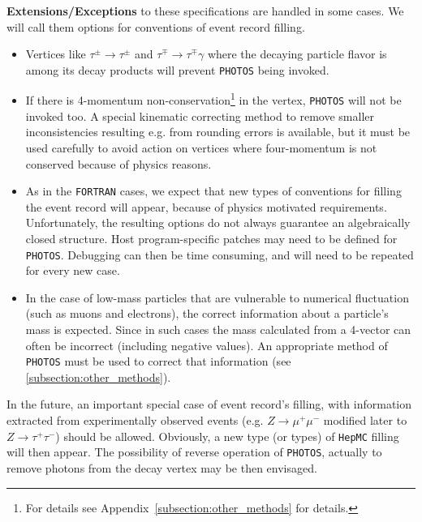 \documentclass[]{Photos_interface_design}
\begin{document}
\noindent
\textbf{ Extensions/Exceptions} to these specifications are handled in some cases. We will call them
options for conventions of event record filling.
  \begin{itemize} 
    \item  Vertices like $\tau^\pm \rightarrow \tau^\pm$ and $\tau^\mp \rightarrow \tau^\mp \gamma$ 
           where the decaying particle flavor is among its decay products will prevent  {\tt PHOTOS} being invoked.

    \item  If there is  4-momentum non-conservation\footnote{For details see 
           Appendix~\ref{subsection:other_methods} for details.} in the vertex,
           {\tt PHOTOS} will not be invoked too.  A special kinematic correcting
           method to remove smaller inconsistencies resulting e.g. from 
           rounding errors is available, but it must be used carefully to avoid
           action on vertices where four-momentum is not conserved because 
           of physics reasons.

    \item
           As in the {\tt FORTRAN} cases, we expect that  new  types of 
           conventions for filling the event record
           will appear, because of physics motivated requirements.
           Unfortunately, the resulting options do not always guarantee
           an algebraically closed structure.  
           Host program-specific patches may need to be defined for
           {\tt PHOTOS}. 
           Debugging can then be time consuming, and will need to be repeated for every new
           case.
           
    \item  In the case of low-mass particles that are vulnerable to numerical fluctuation (such as muons and electrons),
           the correct information about a particle's mass is expected. Since in such cases the mass calculated
           from a 4-vector can often be incorrect (including negative values). An appropriate method
           of {\tt PHOTOS} must be used to correct that information (see \ref{subsection:other_methods}).
   \end{itemize}


 In the future,  an important special case of event record's filling, with
information extracted from experimentally observed events (e.g. $Z\to \mu^+\mu^-$
 modified later to $Z\to \tau^+\tau^-$) should be allowed.
  Obviously, a new type (or types) of {\tt HepMC} filling will then appear.
The possibility of reverse operation of {\tt PHOTOS}, actually to remove 
photons from the decay vertex
may be then envisaged.
\end{document}
